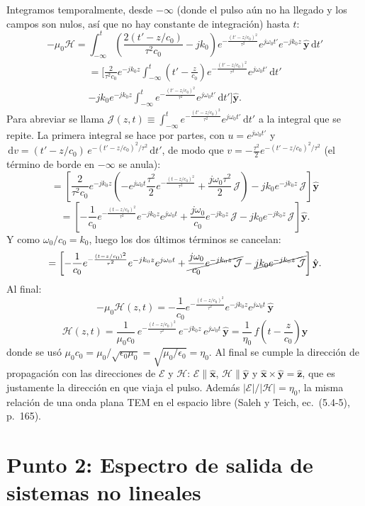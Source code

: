 \documentclass{article}
\newcommand{\Ec}{\boldsymbol{\mathcal{E}}}
\newcommand{\Hc}{\boldsymbol{\mathcal{H}}}
\newcommand{\dd}{\,\mathrm{d}}
\newcommand{\xh}{\hat{\mathbf{x}}}
\newcommand{\yh}{\hat{\mathbf{y}}}
\newcommand{\zh}{\hat{\mathbf{z}}}
\newcommand{\env}{e^{-\frac{(t-z/c_0)^2}{\tau^2}}}
\begin{document}
Integramos temporalmente, desde $-\infty$ (donde el pulso aún no ha llegado y los campos son
nulos, así que no hay constante de integración) hasta $t$:
\[
-\mu_0\Hc=\int_{-\infty}^{t}\left(\frac{2(t'-z/c_0)}{\tau^2c_0}-jk_0\right)
e^{-\frac{(t'-z/c_0)^2}{\tau^2}}e^{j\omega_0t'}e^{-jk_0z}\,\yh\dd t'
\]
\begin{multline*}
=\Bigg[\frac{2}{\tau^2c_0}e^{-jk_0z}\int_{-\infty}^{t}\left(t'-\frac{z}{c_0}\right)
e^{-\frac{(t'-z/c_0)^2}{\tau^2}}e^{j\omega_0t'}\dd t'\\
-jk_0e^{-jk_0z}\int_{-\infty}^{t}e^{-\frac{(t'-z/c_0)^2}{\tau^2}}e^{j\omega_0t'}\dd t'\Bigg]\yh .
\end{multline*}
Para abreviar se llama $\displaystyle\mathcal{J}(z,t)\equiv\int_{-\infty}^{t}e^{-\frac{(t'-z/c_0)^2}{\tau^2}}e^{j\omega_0t'}\dd t'$
a la integral que se repite. La primera integral se hace por partes, con $u=e^{j\omega_0t'}$ y
$\dd v=(t'-z/c_0)\,e^{-(t'-z/c_0)^2/\tau^2}\dd t'$, de modo que
$v=-\frac{\tau^2}{2}e^{-(t'-z/c_0)^2/\tau^2}$ (el término de borde en $-\infty$ se anula):
\[
=\left[\frac{2}{\tau^2c_0}e^{-jk_0z}\left(-e^{j\omega_0t}\frac{\tau^2}{2}\env
+\frac{j\omega_0\tau^2}{2}\,\mathcal{J}\right)
-jk_0e^{-jk_0z}\,\mathcal{J}\right]\yh
\]
\[
=\left[-\frac{1}{c_0}\env e^{-jk_0z}e^{j\omega_0t}
+\frac{j\omega_0}{c_0}e^{-jk_0z}\,\mathcal{J}
-jk_0e^{-jk_0z}\,\mathcal{J}\right]\yh .
\]
Y como $\omega_0/c_0=k_0$, luego los dos últimos términos se cancelan:
\[
=\left[-\frac{1}{c_0}\env e^{-jk_0z}e^{j\omega_0t}
+\cancel{\frac{j\omega_0}{c_0}e^{-jk_0z}\,\mathcal{J}}
-\cancel{jk_0e^{-jk_0z}\,\mathcal{J}}\right]\yh .
\]
Al final:
\[
-\mu_0\Hc(z,t)=-\frac{1}{c_0}\env e^{-jk_0z}e^{j\omega_0t}\,\yh
\]
\[
\boxed{\;\Hc(z,t)=\frac{1}{\mu_0c_0}\,e^{-\frac{(t-z/c_0)^2}{\tau^2}}\,e^{-jk_0z}\,e^{j\omega_0t}\,\yh
=\frac{1}{\eta_0}\,f\!\left(t-\frac{z}{c_0}\right)\yh\;}
\]
donde se usó $\mu_0c_0=\mu_0/\sqrt{\epsilon_0\mu_0}=\sqrt{\mu_0/\epsilon_0}=\eta_0$. Al final se
cumple la dirección de propagación con las direcciones de $\Ec$ y $\Hc$: $\Ec\parallel\xh$,
$\Hc\parallel\yh$ y $\xh\times\yh=\zh$, que es justamente la dirección en que viaja el pulso. Además
$|\Ec|/|\Hc|=\eta_0$, la misma relación de una onda plana TEM en el espacio libre
(Saleh y Teich, ec.~(5.4-5), p.~165).

\newpage
\section{Punto 2: Espectro de salida de sistemas no lineales}
\end{document}
